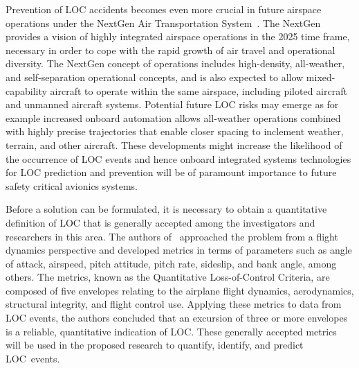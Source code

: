 \documentclass[letter,onecolumn,12pt]{aiaa-tc}
\begin{document}
Prevention of LOC accidents becomes even more crucial in future airspace operations under the NextGen Air Transportation System~\cite{NextGen_ConOps}. The NextGen provides a vision of highly integrated airspace operations in the 2025 time frame, necessary in order to cope with the rapid growth of air travel and operational diversity. The NextGen concept of operations includes high-density, all-weather, and self-separation operational concepts, and is also expected to allow mixed-capability aircraft to operate within the same airspace, including piloted aircraft and unmanned aircraft systems. Potential future LOC risks may emerge as for example increased onboard automation allows all-weather operations combined with highly precise trajectories that enable closer spacing to inclement weather, terrain, and other aircraft. These developments might increase the likelihood of the occurrence of LOC events and hence onboard integrated systems technologies for LOC prediction and prevention will be of paramount importance to future safety critical avionics systems.


Before a solution can be formulated, it is necessary to obtain a quantitative definition of LOC that is generally accepted among the investigators and researchers in this area.
The authors of~\cite{LOC04_LOCMetrics} approached the problem from a flight dynamics perspective and developed metrics in terms of parameters such as angle of attack, airspeed, pitch attitude, pitch rate, sideslip, and bank angle, among others. The metrics, known as the Quantitative Loss-of-Control Criteria, are composed of five envelopes relating to the airplane flight dynamics, aerodynamics, structural integrity, and flight control use. Applying these metrics to data from LOC events, the authors concluded that an excursion of three or more envelopes is a reliable, quantitative indication of LOC. These generally accepted metrics will be used in the proposed research to quantify, identify, and predict LOC~events.
\end{document}
